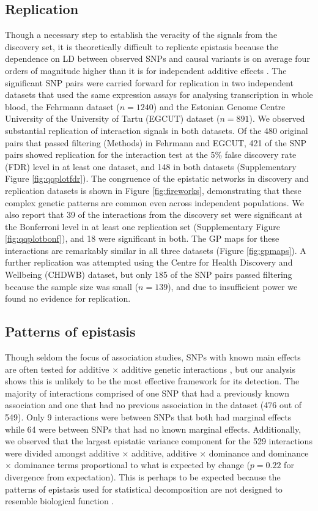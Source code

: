 \documentclass{article}
\begin{document}
\subsection{Replication}
Though a necessary step to establish the veracity of the signals from the discovery set, it is theoretically difficult to replicate epistasis because the dependence on LD between observed SNPs and causal variants is on average four orders of magnitude higher than it is for independent additive effects \cite{Weir2008, Hemani2013}. The significant SNP pairs were carried forward for replication in two independent datasets that used the same expression assays for analysing transcription in whole blood, the Fehrmann dataset \cite{Fehrmann2011} ($n=1240$) and the Estonian Genome Centre University of the University of Tartu (EGCUT) dataset \cite{Metspalu2004} ($n=891$). We observed substantial replication of interaction signals in both datasets. Of the 480 original pairs that passed filtering (Methods) in Fehrmann and EGCUT, 421 of the SNP pairs showed replication for the interaction test at the 5\% false discovery rate (FDR) level in at least one dataset, and 148 in both datasets (Supplementary Figure \ref{fig:qqplotfdr}). The congruence of the epistatic networks in discovery and replication datasets is shown in Figure \ref{fig:fireworks}, demonstrating that these complex genetic patterns are common even across independent populations. We also report that 39 of the interactions from the discovery set were significant at the Bonferroni level in at least one replication set (Supplementary Figure \ref{fig:qqplotbonf}), and 18 were significant in both. The GP maps for these interactions are remarkably similar in all three datasets (Figure \ref{fig:gpmaps}). A further replication was attempted using the Centre for Health Discovery and Wellbeing (CHDWB) dataset, but only 185 of the SNP pairs passed filtering because the sample size was small ($n=139$), and due to insufficient power we found no evidence for replication.


\subsection{Patterns of epistasis}
Though seldom the focus of association studies, SNPs with known main effects are often tested for additive $\times$ additive genetic interactions \cite{Cordell2002, Cordell2009}, but our analysis shows this is unlikely to be the most effective framework for its detection. The majority of interactions comprised of one SNP that had a previously known association and one that had no previous association in the dataset \cite{Powell2013} (476 out of 549). Only 9 interactions were between SNPs that both had marginal effects while 64 were between SNPs that had no known marginal effects. Additionally, we observed that the largest epistatic variance component for the 529 interactions were divided amongst additive $\times$ additive, additive $\times$ dominance and dominance $\times$ dominance terms proportional to what is expected by change ($p = 0.22$ for divergence from expectation). This is perhaps to be expected because the patterns of epistasis used for statistical decomposition are not designed to resemble biological function \cite{Cockerham1954}.
\end{document}
